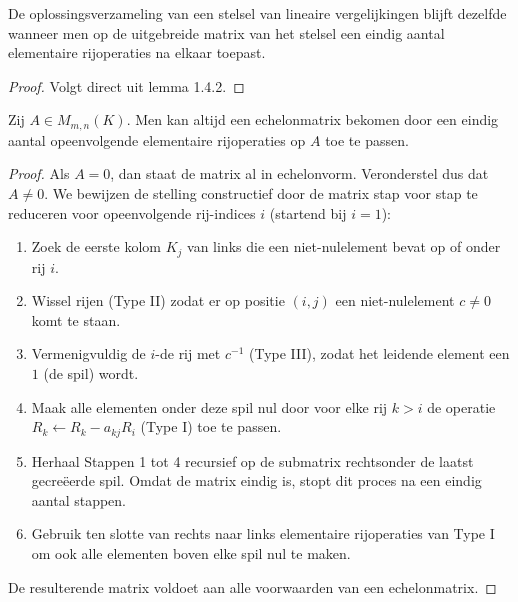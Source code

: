 \begin{gevolg}[1.4.6]
    De oplossingsverzameling van een stelsel van lineaire vergelijkingen blijft dezelfde wanneer men op de uitgebreide matrix van het stelsel een eindig aantal elementaire rijoperaties na elkaar toepast.
\end{gevolg}
\begin{proof}
    Volgt direct uit lemma 1.4.2.
\end{proof}

\begin{stelling}[1.4.10]
    Zij $A \in M_{m,n}(K)$. Men kan altijd een echelonmatrix bekomen door een eindig aantal opeenvolgende elementaire rijoperaties op $A$ toe te passen.
\end{stelling}
\begin{proof}
    Als $A = 0$, dan staat de matrix al in echelonvorm. Veronderstel dus dat $A \neq 0$. We bewijzen de stelling constructief door de matrix stap voor stap te reduceren voor opeenvolgende rij-indices $i$ (startend bij $i=1$):

    \begin{enumerate}
        \item[\textbf{Stap 1.}] Zoek de eerste kolom $K_j$ van links die een niet-nulelement bevat op of onder rij $i$.
        \item[\textbf{Stap 2.}] Wissel rijen (Type II) zodat er op positie $(i, j)$ een niet-nulelement $c \neq 0$ komt te staan.
        \item[\textbf{Stap 3.}] Vermenigvuldig de $i$-de rij met $c^{-1}$ (Type III), zodat het leidende element een $1$ (de spil) wordt.
        \item[\textbf{Stap 4.}] Maak alle elementen onder deze spil nul door voor elke rij $k > i$ de operatie $R_k \leftarrow R_k - a_{kj}R_i$ (Type I) toe te passen.
        \item[\textbf{Stap 5.}] Herhaal Stappen 1 tot 4 recursief op de submatrix rechtsonder de laatst gecreëerde spil. Omdat de matrix eindig is, stopt dit proces na een eindig aantal stappen.
        \item[\textbf{Stap 6.}]  Gebruik ten slotte van rechts naar links elementaire rijoperaties van Type I om ook alle elementen boven elke spil nul te maken.
    \end{enumerate}
    De resulterende matrix voldoet aan alle voorwaarden van een echelonmatrix.
\end{proof}

